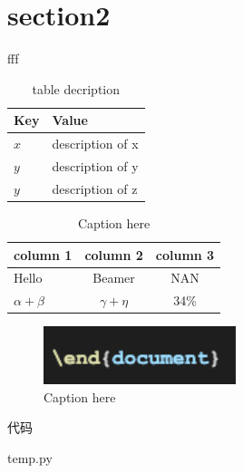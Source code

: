 \documentclass[10pt]{beamer}
\begin{document}
\section{section2}

\begin{frame}{fff}
  \begin{table}
    \centering
    \caption{table decription}
    \label{t_sim}
    \begin{tabular}{|l|l|}
    \hline
    \textbf{Key} & \textbf{Value} \\
    \hline
    $x$ & description of x \\
    $y$ & description of y \\
    $y$ & description of z \\
    \hline
    \end{tabular}
    \end{table}

    \begin{table}[tb]
      \centering
      \caption{Caption here\label{tab:tablename}}
      \begin{tabular}{l|cc}
      \hline
      \textbf{column 1} & \textbf{column 2} & \textbf{column 3} \\ \hline
      Hello & Beamer & NAN \\ \hline
      $\alpha+\beta$ & $\gamma+\eta$ & 34\% \\ \hline
      \end{tabular}
      \end{table}

\end{frame}

\begin{frame}

  \begin{figure}[tb]
    \label{fig:figure1}
    \centering
    \includegraphics[width=0.5\textwidth]{t1.png}
    \caption{Caption here}
  \end{figure}

\end{frame}

\begin{frame}{代码}

  
{temp.py}

\end{frame}
\end{document}
